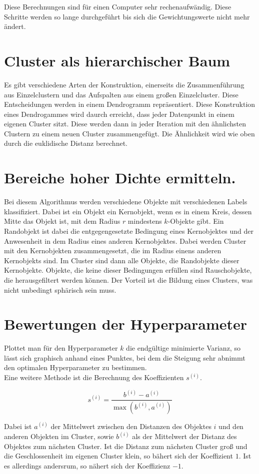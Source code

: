 \documentclass[11pt]{article} %
\begin{document}
Diese Berechnungen sind für einen Computer sehr rechenaufwändig. Diese Schritte werden so lange durchgeführt bis sich die Gewichtungswerte nicht mehr ändert.

\section{Cluster als hierarchischer Baum}

Es gibt verschiedene Arten der Konstruktion, einerseits die Zusammenführung aus Einzelclustern und das Aufspalten aus einem großen Einzelcluster. Diese Entscheidungen werden in einem Dendrogramm repräsentiert. Diese Konstruktion eines Dendrogammes wird daurch erreicht, dass jeder Datenpunkt in einem eigenen Cluster sitzt. Diese werden dann in jeder Iteration mit den ähnlichsten Clustern zu einem neuen Cluster zusammengefügt. Die Ähnlichkeit wird wie oben durch die euklidische Distanz berechnet. 

\section{Bereiche hoher Dichte ermitteln.}

Bei diesem Algorithmus werden verschiedene Objekte mit verschiedenen Labels klassifiziert. Dabei ist ein Objekt ein Kernobjekt, wenn es in einem Kreis, dessen Mitte das Objekt ist, mit dem Radius $r$ mindestens $k$-Objekte gibt. Ein Randobjekt ist dabei die entgegengesetzte Bedingung eines Kernobjektes und der Anwesenheit in dem Radius eines anderen Kernobjektes. Dabei werden Cluster mit den Kernobjekten zusammengesetzt, die im Radius einens anderen Kernobjekts sind. Im Cluster sind dann alle Objekte, die Randobjekte dieser Kernobjekte. Objekte, die keine dieser Bedingungen erfüllen sind Rauschobjekte, die herausgefiltert werden können. Der Vorteil ist die Bildung eines Clusters, was nicht unbedingt sphärisch sein muss. 

\section{Bewertungen der Hyperparameter}
Plottet man für den Hyperparameter $k$ die endgültige minimierte Varianz, so lässt sich graphisch anhand eines Punktes, bei dem die Steigung sehr abnimmt den optimalen Hyperparameter zu bestimmen. \\
Eine weitere Methode ist die Berechnung des Koeffizienten $s^{(i)}$.

\begin{equation}
s^{(i)} = \frac{b^{(i)}-a^{(i)}}{\max{(b^{(i)}, a^{(i)})}}
\end{equation}
 
Dabei ist $a^{(i)}$ der Mittelwert zwischen den Distanzen des Objektes $i$ und den anderen Objekten im Cluster, sowie $b^{(i)}$ als der Mittelwert der Distanz des Objektes zum nächsten Cluster. Ist die  Distanz zum nächsten Cluster groß und die Geschlossenheit im eigenen Cluster klein, so bähert sich der Koeffizient $1$. Ist es allerdings andersrum, so nähert sich der Koeffizienz $-1$.
\end{document}
